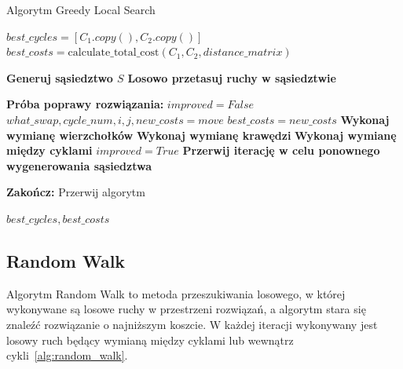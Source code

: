 \documentclass[12pt,a4paper]{article}
\begin{document}
\begin{algorithm}[H]
\caption{Algorytm Greedy Local Search}
\label{alg:greedy_local_search}
\begin{algorithmic}[1]

\State $best\_cycles = [C_1.copy(), C_2.copy()]$
\State $best\_costs = \text{calculate\_total\_cost}(C_1, C_2, distance\_matrix)$

    \State \textbf{Generuj sąsiedztwo $S$}
    \State \textbf{Losowo przetasuj ruchy w sąsiedztwie} 

    \State \textbf{Próba poprawy rozwiązania:}
    \State $improved = False$
        \State $what\_swap, cycle\_num, i, j, new\_costs = move$
            \State $best\_costs = new\_costs$
                \State \textbf{Wykonaj wymianę wierzchołków}
                \State \textbf{Wykonaj wymianę krawędzi}
            \Else
                \State \textbf{Wykonaj wymianę między cyklami}
            \EndIf
            \State $improved = True$
            \State \textbf{Przerwij iterację w celu ponownego wygenerowania sąsiedztwa}
        \EndIf
    \EndFor

        \State \textbf{Zakończ:} Przerwij algorytm
    \EndIf
\EndWhile

\State \Return $best\_cycles, best\_costs$
\end{algorithmic}
\end{algorithm}

\subsection{Random Walk}
Algorytm Random Walk to metoda przeszukiwania losowego, w której wykonywane są losowe ruchy w przestrzeni rozwiązań, a algorytm stara się znaleźć rozwiązanie o najniższym koszcie. W każdej iteracji wykonywany jest losowy ruch będący wymianą między cyklami lub wewnątrz cykli~\ref{alg:random_walk}.
\end{document}
